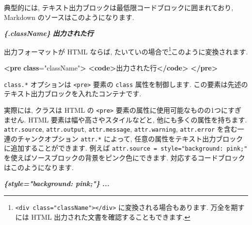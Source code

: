\documentclass[
  11pt,
  lualatex,ja=standard,jafont=noto]{bxjsreport}
\newenvironment{Shaded}{\begin{snugshade}}{\end{snugshade}}
\newcommand{\ErrorTok}[1]{\textcolor[rgb]{0.64,0.00,0.00}{\textbf{#1}}}
\newcommand{\InformationTok}[1]{\textcolor[rgb]{0.56,0.35,0.01}{\textbf{\textit{#1}}}}
\newcommand{\KeywordTok}[1]{\textcolor[rgb]{0.13,0.29,0.53}{\textbf{#1}}}
\newcommand{\NormalTok}[1]{#1}
\newcommand{\OtherTok}[1]{\textcolor[rgb]{0.56,0.35,0.01}{#1}}
\newcommand{\StringTok}[1]{\textcolor[rgb]{0.31,0.60,0.02}{#1}}
\begin{document}
典型的には, テキスト出力ブロックは最低限コードブロックに囲まれており, Markdown のソースはこのようになります.

\begin{Shaded}
\begin{Highlighting}[]
\InformationTok{\textasciigrave{}\textasciigrave{}\textasciigrave{}\{.className\}}
\InformationTok{出力された行}
\InformationTok{\textasciigrave{}\textasciigrave{}\textasciigrave{}}
\end{Highlighting}
\end{Shaded}

出力フォーマットが HTML ならば, たいていの場合で\footnote{\texttt{\textless{}div\ class="className"\textgreater{}\textless{}/div\textgreater{}} に変換される場合もあります. 万全を期すには HTML 出力された文書を確認することもできます.}このように変換されます.

\begin{Shaded}
\begin{Highlighting}[]
\KeywordTok{\textless{}pre} \ErrorTok{class}\OtherTok{=}\StringTok{"className"}\KeywordTok{\textgreater{}}
\KeywordTok{\textless{}code\textgreater{}}\NormalTok{出力された行}\KeywordTok{\textless{}/code\textgreater{}}
\KeywordTok{\textless{}/pre\textgreater{}}
\end{Highlighting}
\end{Shaded}

\texttt{class.*} オプションは \texttt{\textless{}pre\textgreater{}} 要素の \texttt{class} 属性を制御します. この要素は先述のテキスト出力ブロックを入れたコンテナです.

実際には, クラスは HTML の \texttt{\textless{}pre\textgreater{}} 要素の属性に使用可能なものの1つにすぎません. HTML 要素は幅や高さやスタイルなどと, 他にも多くの属性を持ちます. \texttt{attr.source}, \texttt{attr.output}, \texttt{attr.message}, \texttt{attr.warning}, \texttt{attr.error} を含む一連のチャンクオプション \texttt{attr.*} によって, 任意の属性をテキスト出力ブロックに追加することができます. 例えば \texttt{attr.source = \textquotesingle{}style="background:\ pink;"\textquotesingle{}} を使えばソースブロックの背景をピンク色にできます. 対応するコードブロックはこのようになります.

\begin{Shaded}
\begin{Highlighting}[]
\InformationTok{\textasciigrave{}\textasciigrave{}\textasciigrave{}\{style="background: pink;"\}}
\InformationTok{...}
\InformationTok{\textasciigrave{}\textasciigrave{}\textasciigrave{}}
\end{Highlighting}
\end{Shaded}
\end{document}
